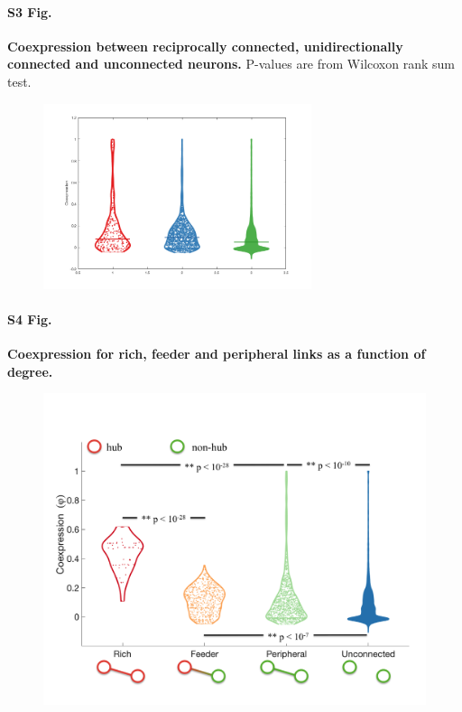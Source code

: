 \documentclass[10pt,letterpaper]{article}
\begin{document}
\paragraph*{S3 Fig.}
{\bf Coexpression between reciprocally connected, unidirectionally connected and unconnected neurons.} P-values are from Wilcoxon rank sum test.
\begin{figure}[!h]
\label{S3_Fig}
\centering
    \includegraphics[width=0.7\textwidth]{RecUnidirUncon}
\end{figure}

\paragraph*{S4 Fig.}
{\bf Coexpression for rich, feeder and peripheral links as a function of degree.}
\begin{figure}[!h]
\label{S4_Fig}
\centering
    \includegraphics[width=1\textwidth]{RichFeederPeripheral_k42FINAL}
\end{figure}
\end{document}
